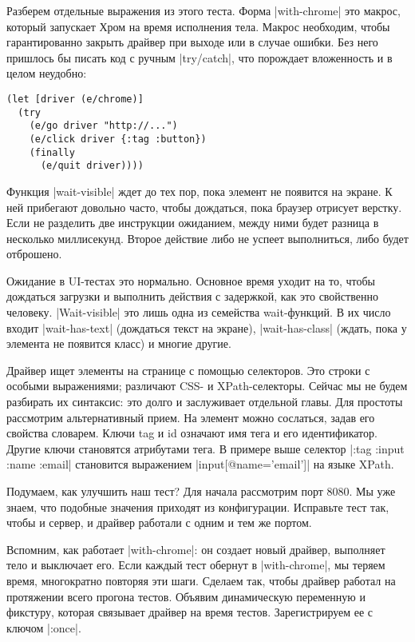Разберем отдельные выражения из этого теста. Форма \spverb|with-chrome| это макрос,
который запускает Хром на время исполнения тела. Макрос необходим, чтобы
гарантированно закрыть драйвер при выходе или в случае ошибки. Без него пришлось
бы писать код с ручным \spverb|try/catch|, что порождает вложенность и в целом
неудобно:

\begin{verbatim}
(let [driver (e/chrome)]
  (try
    (e/go driver "http://...")
    (e/click driver {:tag :button})
    (finally
      (e/quit driver))))
\end{verbatim}

Функция \spverb|wait-visible| ждет до тех пор, пока элемент не появится на экране. К
ней прибегают довольно часто, чтобы дождаться, пока браузер отрисует
верстку. Если не разделить две инструкции ожиданием, между ними будет разница в
несколько миллисекунд. Второе действие либо не успеет выполниться, либо будет
отброшено.

Ожидание в UI-тестах это нормально. Основное время уходит на то, чтобы дождаться
загрузки и выполнить действия с задержкой, как это свойственно
человеку. \spverb|Wait-visible| это лишь одна из семейства wait-функций. В их число
входит \spverb|wait-has-text| (дождаться текст на экране), \spverb|wait-has-class| (ждать,
пока у элемента не появится класс) и многие другие.

Драйвер ищет элементы на странице с помощью селекторов. Это строки с особыми
выражениями; различают CSS- и XPath-селекторы. Сейчас мы не будем разбирать их
синтаксис: это долго и заслуживает отдельной главы. Для простоты рассмотрим
альтернативный прием. На элемент можно сослаться, задав его свойства
словарем. Ключи tag и id означают имя тега и его идентификатор. Другие ключи
становятся атрибутами тега. В примере выше селектор \spverb|{:tag :input :name :email}|
становится выражением \spverb|input[@name='email']| на языке XPath.

Подумаем, как улучшить наш тест? Для начала рассмотрим порт 8080. Мы уже знаем,
что подобные значения приходят из конфигурации. Исправьте тест так, чтобы и
сервер, и драйвер работали с одним и тем же портом.

Вспомним, как работает \spverb|with-chrome|: он создает новый драйвер, выполняет тело и
выключает его. Если каждый тест обернут в \spverb|with-chrome|, мы теряем время,
многократно повторяя эти шаги. Сделаем так, чтобы драйвер работал на протяжении
всего прогона тестов. Объявим динамическую переменную и фикстуру, которая
связывает драйвер на время тестов. Зарегистрируем ее с ключом \spverb|:once|.

